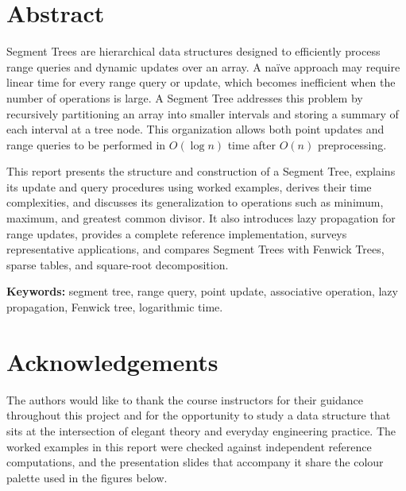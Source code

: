 \documentclass[
  11pt,
  a4paper,
  twoside=false,
  numbers=noenddot,
  headings=big,
  parskip=half,
  toc=bibliography,
  toc=listof,
  bibliography=totoc
]{scrreprt}
\newcounter{example}[chapter]
\begin{document}
\chapter*{Abstract}

Segment Trees are hierarchical data structures designed to efficiently process range queries and dynamic updates over an array. A na\"ive approach may require linear time for every range query or update, which becomes inefficient when the number of operations is large. A Segment Tree addresses this problem by recursively partitioning an array into smaller intervals and storing a summary of each interval at a tree node. This organization allows both point updates and range queries to be performed in $O(\log n)$ time after $O(n)$ preprocessing.

This report presents the structure and construction of a Segment Tree, explains its update and query procedures using worked examples, derives their time complexities, and discusses its generalization to operations such as minimum, maximum, and greatest common divisor. It also introduces lazy propagation for range updates, provides a complete reference implementation, surveys representative applications, and compares Segment Trees with Fenwick Trees, sparse tables, and square-root decomposition.

\bigskip
\noindent\textbf{\sffamily Keywords:} segment tree, range query, point update, associative operation, lazy propagation, Fenwick tree, logarithmic time.

\clearpage
\chapter*{Acknowledgements}

The authors would like to thank the course instructors for their guidance throughout this project and for the opportunity to study a data structure that sits at the intersection of elegant theory and everyday engineering practice. The worked examples in this report were checked against independent reference computations, and the presentation slides that accompany it share the colour palette used in the figures below.

\clearpage
\tableofcontents
\clearpage
\listoffigures
\clearpage
\listoftables
\clearpage

\setcounter{page}{1}
\end{document}
